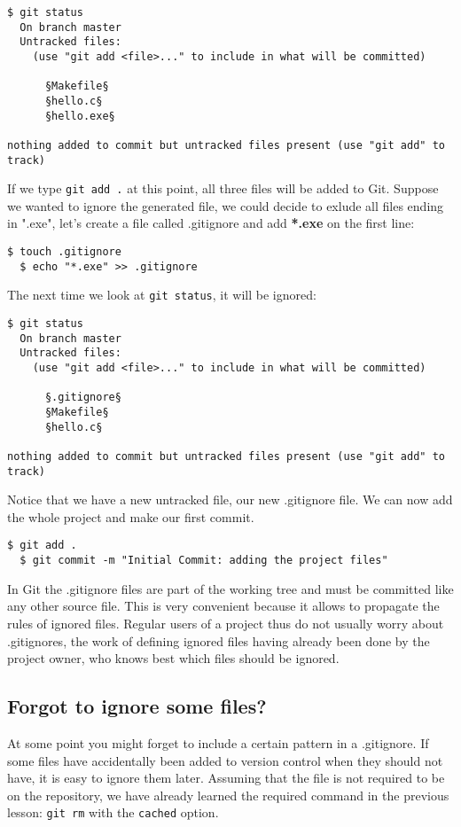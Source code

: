 \documentclass{../../common/tufte-latex/tufte-handout}
\begin{document}
\begin{lstlisting}[style=BashInputStyle]
  $ git status
  On branch master
  Untracked files:
    (use "git add <file>..." to include in what will be committed)
  
      §Makefile§
      §hello.c§
      §hello.exe§

nothing added to commit but untracked files present (use "git add" to track)
\end{lstlisting}

If we type \texttt{git add .} at this point, all three files will be added to Git.
Suppose we wanted to ignore the generated file, we could decide to exlude all files ending in ".exe", let's create a file called .gitignore and add \textbf{*.exe} on the first line:
\begin{lstlisting}[style=BashInputStyle]
  $ touch .gitignore
  $ echo "*.exe" >> .gitignore
\end{lstlisting}

The next time we look at \texttt{git status}, it will be ignored:
\begin{lstlisting}[style=BashInputStyle]
  $ git status
  On branch master
  Untracked files:
    (use "git add <file>..." to include in what will be committed)
  
      §.gitignore§
      §Makefile§
      §hello.c§

nothing added to commit but untracked files present (use "git add" to track)
\end{lstlisting}

Notice that we have a new untracked file, our new .gitignore file.
We can now add the whole project and make our first commit.

\begin{lstlisting}[style=BashInputStyle]
  $ git add .
  $ git commit -m "Initial Commit: adding the project files"
\end{lstlisting}

In Git the .gitignore files are part of the working tree and must be committed like any other source file.
This is very convenient because it allows to propagate the rules of ignored files.
Regular users of a project thus do not usually worry about .gitignores, the work of defining ignored files having already been done by the project owner, who knows best which files should be ignored.

\subsection{Forgot to ignore some files?}
At some point you might forget to include a certain pattern in a .gitignore.
If some files have accidentally been added to version control when they should not have, it is easy to ignore them later.
Assuming that the file is not required to be on the repository, we have already learned the required command in the previous lesson: \texttt{git rm} with the \texttt{cached} option.
\end{document}
